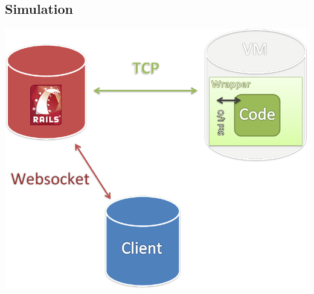 \subsection{Simulation}

\begin{frame}
\begin{center}
	\includegraphics[scale=0.35]{overview}
\end{center}
\end{frame}

